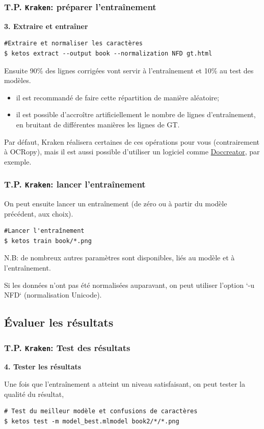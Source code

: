 \documentclass[10pt, compress,urlcolor=blue]{beamer}
\begin{document}
\begin{frame}[fragile]
\frametitle{T.P. \texttt{Kraken}: préparer l'entraînement}


\textbf{3. Extraire et entraîner}
\begin{verbatim}
#Extraire et normaliser les caractères
$ ketos extract --output book --normalization NFD gt.html
\end{verbatim}

Ensuite 90\% des lignes corrigées vont servir à l'entraînement et 10\% au test des modèles.

\begin{itemize}
    \item \alert{il est recommandé de faire cette répartition de manière aléatoire};
    \item \alert{il est possible d'accroître artificiellement le nombre de lignes d'entraînement, en bruitant de différentes manières les lignes de GT.}
\end{itemize}
Par défaut, Kraken réalisera certaines de ces opérations pour vous
(contrairement à OCRopy), mais il est aussi possible d'utiliser un logiciel comme \href{http://doc-creator.labri.fr}{Doccreator}, par exemple.

\end{frame}

\begin{frame}[fragile]
\frametitle{T.P. \texttt{Kraken}: lancer l'entraînement}
    
On peut ensuite lancer un entraînement (de zéro ou à partir du modèle précédent, aux choix). 
\begin{verbatim}
#Lancer l'entraînement
$ ketos train book/*.png
\end{verbatim}

N.B: de nombreux autres paramètres sont disponibles, liés au modèle et à l'entraînement.

Si les données n'ont pas été normalisées auparavant, on peut utiliser l'option
`-u NFD` (normalisation Unicode).

\end{frame}

\subsection{Évaluer les résultats}

\begin{frame}[fragile]
\frametitle{T.P. \texttt{Kraken}: Test des résultats}


\textbf{4. Tester les résultats}

Une fois que l'entraînement a atteint un niveau satisfaisant, on peut tester la qualité du résultat, 

\begin{verbatim}
# Test du meilleur modèle et confusions de caractères
$ ketos test -m model_best.mlmodel book2/*/*.png
\end{verbatim}


\end{frame}
\end{document}
